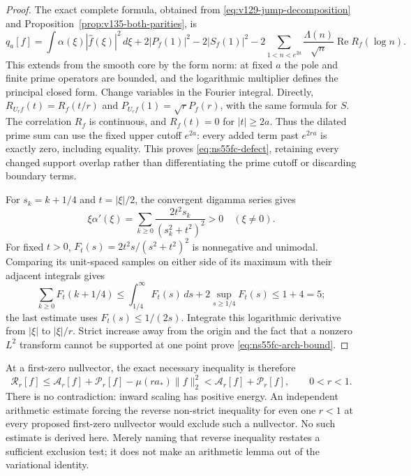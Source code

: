 \begin{proof}
The exact complete formula, obtained from
\eqref{eq:v129-jump-decomposition} and
Proposition~\ref{prop:v135-both-parities}, is
\[
 q_a[f]=\int\alpha(\xi)|\widehat f(\xi)|^2\,d\xi
  +2|P_f(1)|^2-2|S_f(1)|^2
  -2\sum_{1<n<e^{2a}}\frac{\Lambda(n)}{\sqrt n}
                        \operatorname{Re}R_f(\log n).
\]
This extends from the smooth core by the form norm: at fixed $a$
the pole and finite prime operators are bounded, and the logarithmic
multiplier defines the principal closed form. Change variables in
the Fourier integral. Directly,
$R_{U_rf}(t)=R_f(t/r)$ and
$P_{U_rf}(1)=\sqrt r P_f(r)$, with the same formula for $S$.
The correlation $R_f$ is continuous, and $R_f(t)=0$ for
$|t|\ge2a$. Thus the dilated prime sum can use the fixed upper
cutoff $e^{2a}$: every added term past $e^{2ra}$ is exactly zero,
including equality. This proves \eqref{eq:ns55fc-defect}, retaining
every changed support overlap rather than differentiating the prime
cutoff or discarding boundary terms.

For $s_k=k+1/4$ and $t=|\xi|/2$, the convergent digamma series gives
\[
 \xi\alpha'(\xi)
 =\sum_{k\ge0}\frac{2t^2s_k}{(s_k^2+t^2)^2}>0\quad(\xi\ne0).
\]
For fixed $t>0$, $F_t(s)=2t^2s/(s^2+t^2)^2$ is nonnegative and
unimodal. Comparing its unit-spaced samples on either side of its
maximum with their adjacent integrals gives
\[
 \sum_{k\ge0}F_t(k+1/4)
 \le\int_{1/4}^\infty F_t(s)\,ds
               +2\sup_{s\ge1/4}F_t(s)\le1+4=5;
\]
the last estimate uses $F_t(s)\le1/(2s)$. Integrate this logarithmic
derivative from $|\xi|$ to $|\xi|/r$. Strict increase away from the
origin and the fact that a nonzero $L^2$ transform cannot be supported
at one point prove \eqref{eq:ns55fc-arch-bound}.
\end{proof}

At a first-zero nullvector, the exact necessary inequality is therefore
\begin{equation}\label{eq:ns55fc-necessary}
 \mathcal R_r[f]
 \le\mathcal A_r[f]+\mathcal P_r[f]
             -\mu(ra_*)\|f\|_2^2
 <\mathcal A_r[f]+\mathcal P_r[f],\qquad 0<r<1.
\end{equation}
There is no contradiction: inward scaling has positive energy.
An independent arithmetic estimate forcing the reverse non-strict
inequality for even one $r<1$ at every proposed first-zero nullvector
would exclude such a nullvector. No such estimate is derived here.
Merely naming that reverse inequality restates a sufficient exclusion
test; it does not make an arithmetic lemma out of the variational identity.

